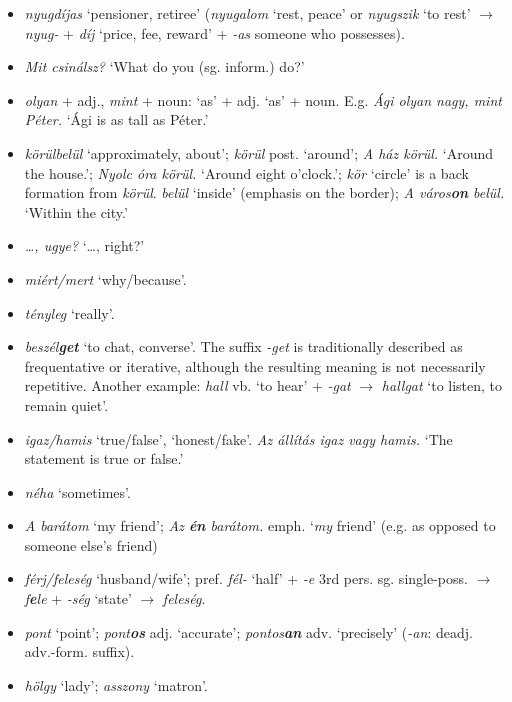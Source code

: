 \documentclass[a4paper,11pt]{article}
\begin{document}
\begin{itemize}
  \item \emph{nyugdíjas} `pensioner, retiree' (\emph{nyugalom} `rest,
    peace' or \emph{nyugszik} `to rest' $\rightarrow$ \emph{nyug-} +
    \emph{díj} `price, fee, reward' + \emph{-as} someone who
    possesses).

  \item \emph{Mit csinálsz?} `What do you (sg. inform.) do?'

  \item \emph{olyan} + adj., \emph{mint} + noun: `as' + adj. `as' +
    noun. E.g. \emph{Ági olyan nagy, mint Péter.} `Ági is as tall as
    Péter.'

  \item \emph{körülbelül} `approximately, about'; \emph{körül}
    post. `around'; \emph{A ház körül.} `Around the house.';
    \emph{Nyolc óra körül.} `Around eight o'clock.'; \emph{kör}
    `circle' is a back formation from \emph{körül}. \emph{belül}
    `inside' (emphasis on the border); \emph{A város\textbf{on}
    belül.} `Within the city.'

  \item \emph{\ldots, ugye?} `\ldots, right?'

  \item \emph{miért/mert} `why/because'.

  \item \emph{tényleg} `really'.

  \item \emph{beszél\textbf{get}} `to chat, converse'. The suffix
    \emph{-get} is traditionally described as frequentative or
    iterative, although the resulting meaning is not necessarily
    repetitive. Another example: \emph{hall} vb. `to hear' +
    \emph{-gat} $\rightarrow$ \emph{hallgat} `to listen, to remain
    quiet'.

  \item \emph{igaz/hamis} `true/false', `honest/fake'. \emph{Az
  állítás igaz vagy hamis.} `The statement is true or false.'

  \item \emph{néha} `sometimes'.

  \item \emph{A barátom} `my friend'; \emph{Az \textbf{én} barátom.}
    emph. `\emph{my} friend' (e.g. as opposed to someone else's
    friend)

  \item \emph{férj/feleség} `husband/wife'; pref. \emph{fél-} `half' +
    \emph{-e} 3rd pers. sg. single\hyp{}poss. $\rightarrow$
    \emph{f\textbf{e}le} + \emph{-ség} `state' $\rightarrow$
    \emph{feleség}.

  \item \emph{pont} `point'; \emph{pont\textbf{os}} adj. `accurate';
    \emph{pontos\textbf{an}} adv. `precisely' (\emph{-an}:
    deadj. adv.-form. suffix).

  \item \emph{hölgy} `lady'; \emph{asszony} `matron'.

\end{itemize}
\end{document}
